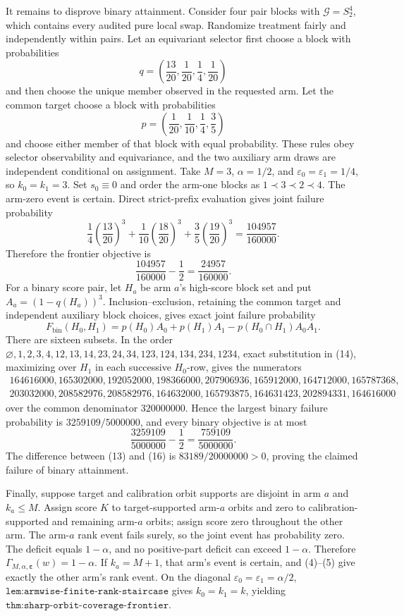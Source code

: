 It remains to disprove binary attainment. Consider four pair blocks with \(\mathcal G=S_2^4\), which contains every audited pure local swap. Randomize treatment fairly and independently within pairs. Let an equivariant selector first choose a block with probabilities
\[
q=\left(\frac{13}{20},\frac1{20},\frac14,\frac1{20}\right)
\tag{10}
\]
and then choose the unique member observed in the requested arm. Let the common target choose a block with probabilities
\[
p=\left(\frac1{20},\frac1{10},\frac14,\frac35\right)
\tag{11}
\]
and choose either member of that block with equal probability. These rules obey selector observability and equivariance, and the two auxiliary arm draws are independent conditional on assignment. Take \(M=3\), \(\alpha=1/2\), and \(\varepsilon_0=\varepsilon_1=1/4\), so \(k_0=k_1=3\). Set \(s_0\equiv0\) and order the arm-one blocks as \(1\prec3\prec2\prec4\). The arm-zero event is certain. Direct strict-prefix evaluation gives joint failure probability
\[
\frac14\left(\frac{13}{20}\right)^3+\frac1{10}\left(\frac{18}{20}\right)^3+\frac35\left(\frac{19}{20}\right)^3=\frac{104957}{160000}.
\tag{12}
\]
Therefore the frontier objective is
\[
\frac{104957}{160000}-\frac12=\frac{24957}{160000}.
\tag{13}
\]
For a binary score pair, let \(H_a\) be arm \(a\)'s high-score block set and put \(A_a=(1-q(H_a))^3\). Inclusion--exclusion, retaining the common target and independent auxiliary block choices, gives exact joint failure probability
\[
F_{\mathrm{bin}}(H_0,H_1)=p(H_0)A_0+p(H_1)A_1-p(H_0\cap H_1)A_0A_1.
\tag{14}
\]
There are sixteen subsets. In the order \(\varnothing,1,2,3,4,12,13,14,23,24,34,123,124,134,234,1234\), exact substitution in (14), maximizing over \(H_1\) in each successive \(H_0\)-row, gives the numerators
\[
\begin{gathered}
164616000,165302000,192052000,198366000,207906936,165912000,164712000,165787368,\\
203032000,208582976,208582976,164632000,165793875,164631423,202894331,164616000
\end{gathered}
\tag{15}
\]
over the common denominator \(320000000\). Hence the largest binary failure probability is \(3259109/5000000\), and every binary objective is at most
\[
\frac{3259109}{5000000}-\frac12=\frac{759109}{5000000}.
\tag{16}
\]
The difference between (13) and (16) is \(83189/20000000>0\), proving the claimed failure of binary attainment.

Finally, suppose target and calibration orbit supports are disjoint in arm \(a\) and \(k_a\le M\). Assign score \(K\) to target-supported arm-\(a\) orbits and zero to calibration-supported and remaining arm-\(a\) orbits; assign score zero throughout the other arm. The arm-\(a\) rank event fails surely, so the joint event has probability zero. The deficit equals \(1-\alpha\), and no positive-part deficit can exceed \(1-\alpha\). Therefore \(\Gamma_{M,\alpha,\boldsymbol\varepsilon}(w)=1-\alpha\). If \(k_a=M+1\), that arm's event is certain, and (4)--(5) give exactly the other arm's rank event. On the diagonal \(\varepsilon_0=\varepsilon_1=\alpha/2\), \(\texttt{lem:armwise-finite-rank-staircase}\) gives \(k_0=k_1=k\), yielding \(\texttt{thm:sharp-orbit-coverage-frontier}\).